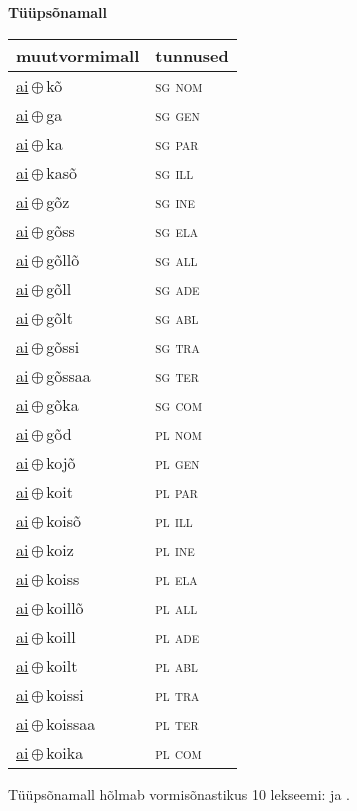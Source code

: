 

\vspace{3.5em}
\noindent \begin{minipage}{\textwidth}
\noindent \textbf{Tüüpsõnamall \,}\\

\begin{sideways}
\begin{tabular}{l l}
muutvormimall & tunnused \\
\hline
\underline{ai}\,$\oplus$\,kõ & \textsc{ sg nom } \\
\underline{ai}\,$\oplus$\,ga & \textsc{ sg gen } \\
\underline{ai}\,$\oplus$\,ka & \textsc{ sg par } \\
\underline{ai}\,$\oplus$\,kasõ & \textsc{ sg ill } \\
\underline{ai}\,$\oplus$\,gõz & \textsc{ sg ine } \\
\underline{ai}\,$\oplus$\,gõss & \textsc{ sg ela } \\
\underline{ai}\,$\oplus$\,gõllõ & \textsc{ sg all } \\
\underline{ai}\,$\oplus$\,gõll & \textsc{ sg ade } \\
\underline{ai}\,$\oplus$\,gõlt & \textsc{ sg abl } \\
\underline{ai}\,$\oplus$\,gõssi & \textsc{ sg tra } \\
\underline{ai}\,$\oplus$\,gõssaa & \textsc{ sg ter } \\
\underline{ai}\,$\oplus$\,gõka & \textsc{ sg com } \\
\underline{ai}\,$\oplus$\,gõd & \textsc{ pl nom } \\
\underline{ai}\,$\oplus$\,kojõ & \textsc{ pl gen } \\
\underline{ai}\,$\oplus$\,koit & \textsc{ pl par } \\
\underline{ai}\,$\oplus$\,koisõ & \textsc{ pl ill } \\
\underline{ai}\,$\oplus$\,koiz & \textsc{ pl ine } \\
\underline{ai}\,$\oplus$\,koiss & \textsc{ pl ela } \\
\underline{ai}\,$\oplus$\,koillõ & \textsc{ pl all } \\
\underline{ai}\,$\oplus$\,koill & \textsc{ pl ade } \\
\underline{ai}\,$\oplus$\,koilt & \textsc{ pl abl } \\
\underline{ai}\,$\oplus$\,koissi & \textsc{ pl tra } \\
\underline{ai}\,$\oplus$\,koissaa & \textsc{ pl ter } \\
\underline{ai}\,$\oplus$\,koika & \textsc{ pl com } \\
\end{tabular}
\end{sideways}
\label{tab:tüüpsõnamall-aikõ}

\end{minipage}

 
\vspace{1em}
\noindent Tüüpsõnamall  hõlmab vormisõnastikus 10 lekseemi:  ja .

